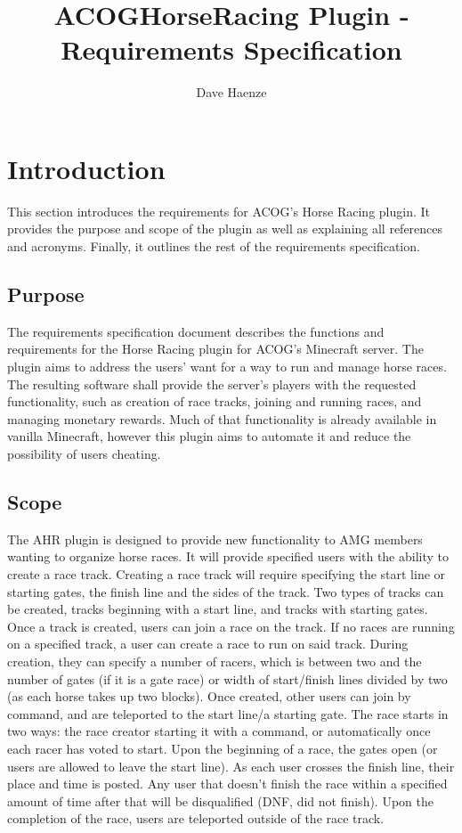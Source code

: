 \documentclass[a4paper, 11pt]{article} %
\title{ACOGHorseRacing Plugin - Requirements Specification}
\author{Dave Haenze}
\begin{document}
\maketitle
\newpage
\tableofcontents
\newpage
\section{Introduction}

This section introduces the requirements for ACOG's Horse Racing plugin. It provides the purpose and scope of the plugin as well as explaining all references and acronyms. Finally, it outlines the rest of the requirements specification.

\subsection{Purpose}

The requirements specification document describes the functions and requirements for the Horse Racing plugin for ACOG's Minecraft server. The plugin aims to address the users' want for a way to run and manage horse races. The resulting software shall provide the server's players with the requested functionality, such as creation of race tracks, joining and running races, and managing monetary rewards. Much of that functionality is already available in vanilla Minecraft, however this plugin aims to automate it and reduce the possibility of users cheating.

\subsection{Scope}

The AHR plugin is designed to provide new functionality to AMG members wanting to organize horse races. It will provide specified users with the ability to create a race track. Creating a race track will require specifying the start line or starting gates, the finish line and the sides of the track. Two types of tracks can be created, tracks beginning with a start line, and tracks with starting gates. Once a track is created, users can join a race on the track. If no races are running on a specified track, a user can create a race to run on said track. During creation, they can specify a number of racers, which is between two and the number of gates (if it is a gate race) or width of start/finish lines divided by two (as each horse takes up two blocks). Once created, other users can join by command, and are teleported to the start line/a starting gate. The race starts in two ways: the race creator starting it with a command, or automatically once each racer has voted to start. Upon the beginning of a race, the gates open (or users are allowed to leave the start line). As each user crosses the finish line, their place and time is posted. Any user that doesn't finish the race within a specified amount of time after that will be disqualified (DNF, did not finish). Upon the completion of the race, users are teleported outside of the race track.
\end{document}
